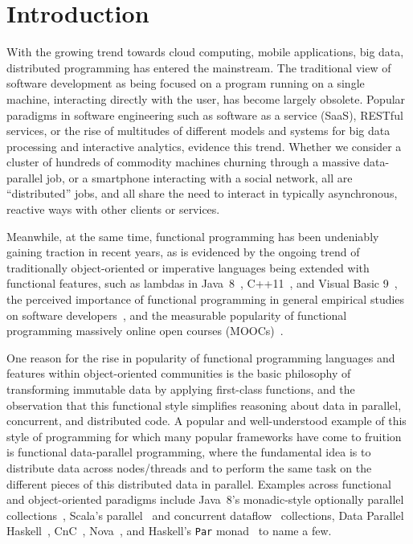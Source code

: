 \documentclass{llncs}
\begin{document}
\section{Introduction}

With the growing trend towards cloud computing, mobile applications, big data,
distributed programming has entered the mainstream. The
traditional view of software development as being focused on a program running
on a single machine, interacting directly with the user, has become largely
obsolete. Popular paradigms in software engineering such as software as a
service (SaaS), RESTful services, or the rise of multitudes of different
models and systems for big data processing and interactive analytics, evidence
this trend. Whether we consider a cluster of hundreds of commodity machines
churning through a massive data-parallel job, or a smartphone interacting with
a social network, all are ``distributed'' jobs, and all share the need to
interact in typically asynchronous, reactive ways with other clients or
services.

Meanwhile, at the same time, functional programming has been undeniably
gaining traction in recent years, as is evidenced by the ongoing trend of
traditionally object-oriented or imperative languages being extended with
functional features, such as lambdas in \mbox{Java 8}~\cite{JavaLambdas},
C++11~\cite{CplusplusLambas}, and Visual Basic 9~\cite{Meijer}, the perceived
importance of functional programming in general empirical studies on software
developers~\cite{PLAdoption}, and the measurable popularity of functional
programming massively online open courses (MOOCs)~\cite{ICSEMOOC}.

One reason for the rise in popularity of functional programming languages and
features within object-oriented communities is the basic philosophy of
transforming immutable data by applying first-class functions, and the
observation that this functional style simplifies reasoning about data in
parallel, concurrent, and distributed code. A popular and well-understood
example of this style of programming for which many popular frameworks have
come to fruition is functional data-parallel programming, where the
fundamental idea is to distribute data across nodes/threads and to perform the
same task on the different pieces of this distributed data in parallel.
Examples across functional and object-oriented paradigms include \mbox{Java
8}'s monadic-style optionally parallel collections~\cite{JavaLambdas}, Scala's
parallel~\cite{ScalaParColls} and concurrent dataflow~\cite{FlowPools}
collections, Data Parallel Haskell~\cite{DataParallelHaskell}, CnC~\cite{CnC}, Nova~\cite{Nova}, and Haskell's \verb|Par|
monad~\cite{HaskellPar} to name a few.
\end{document}
